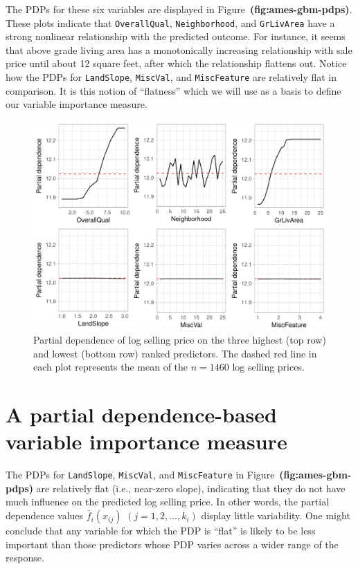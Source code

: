 \documentclass[12pt]{article}
\def\code#1{\texttt{#1}}
\def\ref#1{\textbf{(#1)}}
\begin{document}
The PDPs for these six variables are displayed in Figure~\ref{fig:ames-gbm-pdps}. These plots indicate that \code{OverallQual}, \code{Neighborhood}, and \code{GrLivArea} have a strong nonlinear relationship with the predicted outcome. For instance, it seems that above grade living area has a monotonically increasing relationship with sale price until about 12 square feet, after which the relationship flattens out. Notice how the PDPs for \code{LandSlope}, \code{MiscVal}, and \code{MiscFeature} are relatively flat in comparison. It is this notion of ``flatness'' which we will use as a basis to define our variable importance measure.

\begin{figure}[!htb]
  \centering
  \includegraphics[width=1.0\textwidth]{ames-gbm-pdps}
  \caption{Partial dependence of log selling price on the three highest (top row) and lowest (bottom row) ranked predictors. The dashed red line in each plot represents the mean of the $n = 1460$ log selling prices. \label{fig:ames-gbm-pdps}}
\end{figure}


\section{A partial dependence-based variable importance measure}
\label{sec:new}

The PDPs for \code{LandSlope}, \code{MiscVal}, and \code{MiscFeature} in Figure~\ref{fig:ames-gbm-pdps} are relatively flat (i.e., near-zero slope), indicating that they do not have much influence on the predicted log selling price. In other words, the partial dependence values $\bar{f}_i\left(x_{ij}\right)$ $\left(j = 1, 2, \dots, k_i\right)$ display little variability. One might conclude that any variable for which the PDP is ``flat'' is likely to be less important than those predictors whose PDP varies across a wider range of the response.
\end{document}
